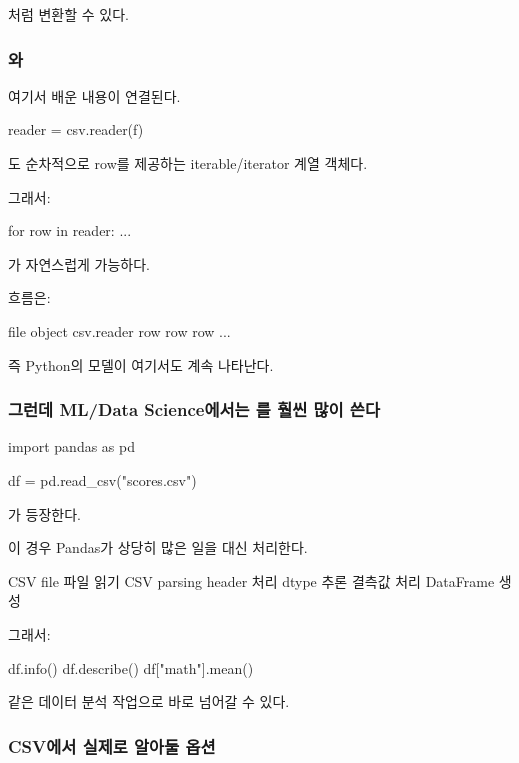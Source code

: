 처럼 변환할 수 있다.

\subsubsection{와 }

여기서 배운 내용이 연결된다.

\begin{dhkcode}
reader = csv.reader(f)
\end{dhkcode}

도 순차적으로 row를 제공하는 iterable/iterator 계열 객체다.

그래서:

\begin{dhkcode}
for row in reader:
    ...
\end{dhkcode}

가 자연스럽게 가능하다.

흐름은:

\begin{dhksmry}[centered]
file object
\da
csv.reader
\da
row
\da
row
\da
row
\da
...
\end{dhksmry}

즉 Python의 모델이 여기서도 계속 나타난다.

\subsubsection{그런데 ML/Data Science에서는 를 훨씬 많이 쓴다}

\begin{dhkcode}
import pandas as pd

df = pd.read_csv("scores.csv")
\end{dhkcode}

가 등장한다.

이 경우 Pandas가 상당히 많은 일을 대신 처리한다.

\begin{dhksmry}[centered]
CSV file
\da
파일 읽기
\da
CSV parsing
\da
header 처리
\da
dtype 추론
\da
결측값 처리
\da
DataFrame 생성
\end{dhksmry}

그래서:

\begin{dhkcode}
df.info()
df.describe()
df["math"].mean()
\end{dhkcode}

같은 데이터 분석 작업으로 바로 넘어갈 수 있다.

\subsubsection{CSV에서 실제로 알아둘 옵션}

